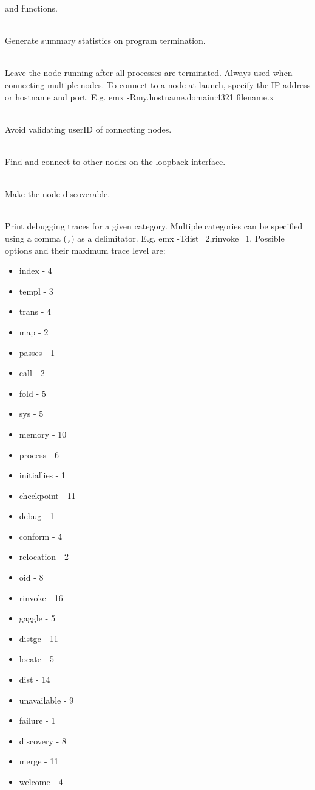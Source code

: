 \begin{description}
\begin{description}
	and functions.
      \item[-v]{} ~\\
	Generate summary statistics on program termination.
      \item[-R]{} ~\\
	Leave the node running after all processes are terminated.
    Always used when connecting multiple nodes. To connect to a node at
    launch, specify the IP address or hostname and port.
    E.g. emx -Rmy.hostname.domain:4321 filename.x
      \item[-U]{} ~\\
    Avoid validating userID of connecting nodes.
      \item[-S]{} ~\\
    Find and connect to other nodes on the loopback interface.
      \item[-D]{} ~\\
    Make the node discoverable.
      \item[-T$<$category$>$=$<$level$>$]{} ~\\
    Print debugging traces for a given category. Multiple categories can be
    specified using a comma ({\tt ,}) as a delimitator. E.g. emx -Tdist=2,rinvoke=1.
    Possible options and their maximum trace level are:
    \begin{itemize}
        \item index - 4
        \item templ - 3
        \item trans - 4
        \item map - 2
        \item passes - 1
        \item call - 2
        \item fold - 5
        \item sys - 5
        \item memory - 10
        \item process - 6
        \item initiallies - 1
        \item checkpoint - 11
        \item debug - 1
        \item conform - 4
        \item relocation - 2
        \item oid - 8
        \item rinvoke - 16
        \item gaggle - 5
        \item distgc - 11
        \item locate - 5
        \item dist - 14
        \item unavailable - 9
        \item failure - 1
        \item discovery - 8
        \item merge - 11
        \item welcome - 4
    \end{itemize}
    \end{description}
\end{description}

